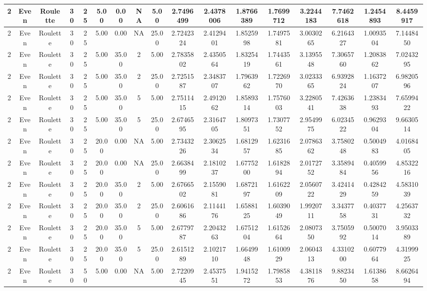 \documentclass[a4paper]{article}
\begin{document}
\begin{center}
\begin{tabular}{ | c | c | c | c | c | c | c | c | c | c | c | c | c | c | c | c | c | }
		\hline
		2	&	Even	&	Roulette	&	30	&	25	&	5.00	&	0.00	&	NA	&	5.00	&	2.7496499	&	2.4378006	&	1.8766389	&	1.7699712	&	3.2244183	&	7.7462618	&	1.2454893	&	8.4459917 \\
		\hline
		2	&	Even	&	Roulette	&	30	&	25	&	5.00	&	0.00	&	NA	&	25.00	&	2.7242324	&	2.4129401	&	1.8525998	&	1.7497581	&	3.0030265	&	6.2164327	&	1.0093504	&	7.1448450 \\
		\hline
		2	&	Even	&	Roulette	&	30	&	25	&	5.00	&	35.00	&	2	&	5.00	&	2.7835802	&	2.4350564	&	1.8325419	&	1.7443561	&	3.1395548	&	7.3065760	&	1.2083862	&	7.0243295 \\
		\hline
		2	&	Even	&	Roulette	&	30	&	25	&	5.00	&	35.00	&	2	&	25.00	&	2.7251587	&	2.3483707	&	1.7963962	&	1.7226970	&	3.0233365	&	6.9392824	&	1.1637207	&	6.9820596 \\
		\hline
		2	&	Even	&	Roulette	&	30	&	25	&	5.00	&	35.00	&	5	&	5.00	&	2.7511415	&	2.4912062	&	1.8589314	&	1.7576003	&	3.2280541	&	7.4263638	&	1.2383493	&	7.6599422 \\
		\hline
		2	&	Even	&	Roulette	&	30	&	25	&	5.00	&	35.00	&	5	&	25.00	&	2.6746595	&	2.3164705	&	1.8097351	&	1.7307752	&	2.9549975	&	6.0234522	&	0.9629304	&	9.6630514 \\
		\hline
		2	&	Even	&	Roulette	&	30	&	25	&	20.00	&	0.00	&	NA	&	5.00	&	2.7343226	&	2.3062534	&	1.6812957	&	1.6231685	&	2.0786362	&	3.7580248	&	0.5004983	&	4.0168405 \\
		\hline
		2	&	Even	&	Roulette	&	30	&	25	&	20.00	&	0.00	&	NA	&	25.00	&	2.6638499	&	2.1810237	&	1.6775200	&	1.6182894	&	2.0172752	&	3.3589484	&	0.4059956	&	4.8532216 \\
		\hline
		2	&	Even	&	Roulette	&	30	&	25	&	20.00	&	35.00	&	2	&	5.00	&	2.6766502	&	2.1559081	&	1.6872197	&	1.6162209	&	2.0560722	&	3.4241429	&	0.4284259	&	4.5831039 \\
		\hline
		2	&	Even	&	Roulette	&	30	&	25	&	20.00	&	35.00	&	2	&	25.00	&	2.6061686	&	2.1144176	&	1.6588125	&	1.6039049	&	1.9920711	&	3.3437758	&	0.4037731	&	4.2563732 \\
		\hline
		2	&	Even	&	Roulette	&	30	&	25	&	20.00	&	35.00	&	5	&	5.00	&	2.6779787	&	2.2043263	&	1.6751204	&	1.6152664	&	2.0807350	&	3.7505992	&	0.5007014	&	3.9503389 \\
		\hline
		2	&	Even	&	Roulette	&	30	&	25	&	20.00	&	35.00	&	5	&	25.00	&	2.6151289	&	2.1021710	&	1.6649948	&	1.6100929	&	2.0604313	&	4.3310200	&	0.6077964	&	4.3199925 \\
		\hline
		2	&	Even	&	Roulette	&	30	&	50	&	5.00	&	0.00	&	NA	&	5.00	&	2.7220945	&	2.4537551	&	1.9415272	&	1.7985853	&	4.3811876	&	9.8823450	&	1.6138658	&	8.6626494 \\

\end{tabular}
\end{center}
\end{document}
